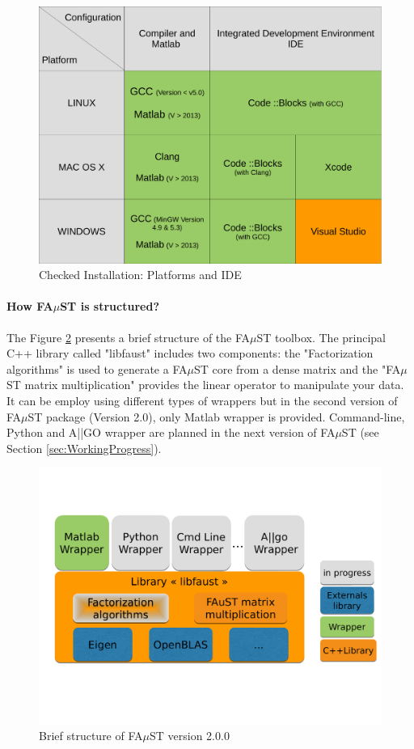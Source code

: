 \begin{figure}[H] %
\centering
\includegraphics[scale=0.4]{images/recapInstall.pdf}
\caption{Checked Installation: Platforms and IDE}
\label{fig:recapInstall}
\end{figure}

\paragraph{How FA$\mu$ST is structured?}
The Figure \ref{fig:faustStructure} presents a brief structure of the FA$\mu$ST toolbox. The principal C++ library called "libfaust" includes two components: the "Factorization algorithms" is used to generate a FA$\mu$ST core from a dense matrix and the "FA$\mu$ST matrix multiplication" provides the linear operator to manipulate your data. It can be employ using different types of wrappers but in the second version of FA$\mu$ST package (Version 2.0), only Matlab wrapper is provided. Command-line, Python and A||GO wrapper are planned in the next version of FA$\mu$ST (see Section \ref{sec:WorkingProgress}).   


\begin{figure}[H] %
\centering
\includegraphics[scale=0.45,trim = 0cm 5cm 0cm 4cm, clip]{images/FaustStructure.pdf}
\caption{Brief structure of FA$\mu$ST version 2.0.0}
\label{fig:faustStructure}
\end{figure}

